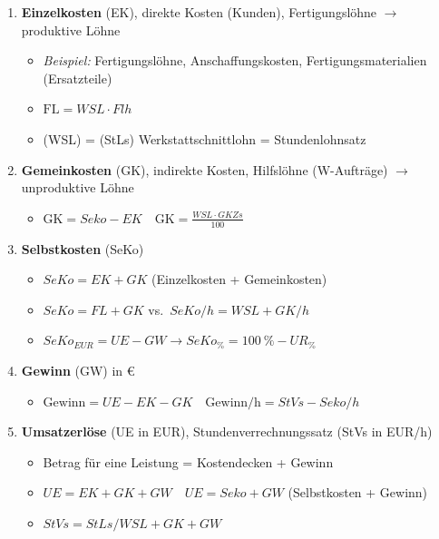 \begin{enumerate}
\item
  \textbf{Einzelkosten} (EK), direkte Kosten (Kunden), Fertigungslöhne
  $\to$ produktive Löhne

  \begin{itemize}
  \item
    \emph{Beispiel:} Fertigungslöhne, Anschaffungskosten,
    Fertigungsmaterialien (Ersatzteile)
  \item
    $\boxed{\text{FL} = WSL \cdot Flh}$\\
  \item
    (WSL) = (StLs) Werkstattschnittlohn = Stundenlohnsatz
  \end{itemize}
\item
  \textbf{Gemeinkosten} (GK), indirekte Kosten, Hilfslöhne (W-Aufträge)
  $\to$ unproduktive Löhne

  \begin{itemize}
  \item
    $\boxed{\text{GK} = Seko - EK} \quad \boxed{\text{GK} = \frac{WSL \cdot GKZs}{100}}$
  \end{itemize}
\item
  \textbf{Selbstkosten} (SeKo)

  \begin{itemize}
  \item
    $\boxed{SeKo = EK + GK}$ (Einzelkosten + Gemeinkosten)
  \item
    $\boxed{SeKo = FL + GK}$ vs.~$\boxed{SeKo/h = WSL + GK/h}$
  \item
    $\boxed{SeKo_{EUR} = UE - GW} \to \boxed{SeKo_\% = 100~\% - UR_\%}$
  \end{itemize}
\item
  \textbf{Gewinn} (GW) in €

  \begin{itemize}
  \item
    $\boxed{\text{Gewinn} = UE - EK - GK} \quad \boxed{\text{Gewinn/h} = StVs - Seko/h}$
  \end{itemize}
\item
  \textbf{Umsatzerlöse} (UE in EUR), Stundenverrechnungssatz (StVs in
  EUR/h)

  \begin{itemize}
  \item
    Betrag für eine Leistung = Kostendecken + Gewinn
  \item
    $\boxed{UE = EK + GK + GW} \quad \boxed{UE = Seko + GW}$
    (Selbstkosten + Gewinn)
  \item
    $\boxed{StVs = StLs/WSL + GK + GW}$
  \end{itemize}
\end{enumerate}

